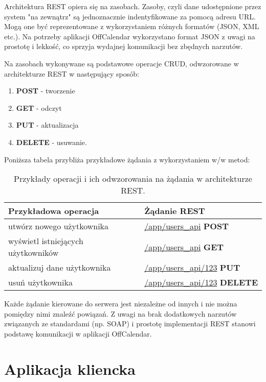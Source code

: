 Architektura REST opiera się na zasobach. Zasoby, czyli dane udostępnione przez system "na zewnątrz" są jednoznacznie indentyfikowane za pomocą adresu URL. Mogą one być reprezentowane z wykorzystaniem różnych formatów (JSON, XML etc.). Na potrzeby aplikacji OffCalendar wykorzystano format JSON z uwagi na prostotę i lekkość, co sprzyja wydajnej komunikacji bez zbędnych narzutów.

Na zasobach wykonywane są podstawowe operacje CRUD, odwzorowane w architekturze REST w następujący sposób:

\begin{enumerate}
\item\textbf{POST} - tworzenie
\item \textbf{GET} - odczyt
\item \textbf{PUT} - aktualizacja
\item \textbf{DELETE} - usuwanie.
\end{enumerate}

Poniższa tabela przybliża przykładowe żądania z wykorzystaniem w/w metod:

\begin{table}[h]
\centering
    \begin{tabular}{ | p{7cm} | p{7cm} | }
    \hline
    \textbf{Przykładowa operacja} & \textbf{Żądanie REST} \\ \hline
	utwórz nowego użytkownika & \url{/app/users_api} \textbf{POST}
	\\ \hline
	wyświetl istniejących użytkowników & \url{/app/users_api} \textbf{GET}
	\\ \hline
	aktualizuj dane użytkownika & \url{/app/users_api/123} \textbf{PUT}
	\\ \hline
	usuń użytkownika & \url{/app/users_api/123} \textbf{DELETE}
	\\ \hline
    \end{tabular}
	\caption{Przykłady operacji i ich odwzorowania na żądania w architekturze REST.}
\end{table}

Każde żądanie kierowane do serwera jest niezależne od innych i nie można pomiędzy nimi znaleźć powiązań. Z uwagi na brak dodatkowych narzutów związanych ze standardami (np. SOAP) i prostotę implementacji REST stanowi podstawę komunikacji w aplikacji OffCalendar.


\section{Aplikacja kliencka}
\label{sec:appKliencka}

